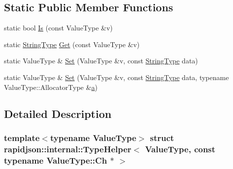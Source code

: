 \subsection*{Static Public Member Functions}
\begin{DoxyCompactItemize}
\item 
static bool \mbox{\hyperlink{structrapidjson_1_1internal_1_1_type_helper_3_01_value_type_00_01const_01typename_01_value_type_1_1_ch_01_5_01_4_abb87b939b67b66f0cd806513be7b2344}{Is}} (const Value\+Type \&v)
\item 
static \mbox{\hyperlink{structrapidjson_1_1internal_1_1_type_helper_3_01_value_type_00_01const_01typename_01_value_type_1_1_ch_01_5_01_4_a511422342701bd19c777d477275991e8}{String\+Type}} \mbox{\hyperlink{structrapidjson_1_1internal_1_1_type_helper_3_01_value_type_00_01const_01typename_01_value_type_1_1_ch_01_5_01_4_aa548b8d444b141ee138867898b4248d6}{Get}} (const Value\+Type \&v)
\item 
static Value\+Type \& \mbox{\hyperlink{structrapidjson_1_1internal_1_1_type_helper_3_01_value_type_00_01const_01typename_01_value_type_1_1_ch_01_5_01_4_a160c27c3120a9e6e4efcb8dd1134c020}{Set}} (Value\+Type \&v, const \mbox{\hyperlink{structrapidjson_1_1internal_1_1_type_helper_3_01_value_type_00_01const_01typename_01_value_type_1_1_ch_01_5_01_4_a511422342701bd19c777d477275991e8}{String\+Type}} data)
\item 
static Value\+Type \& \mbox{\hyperlink{structrapidjson_1_1internal_1_1_type_helper_3_01_value_type_00_01const_01typename_01_value_type_1_1_ch_01_5_01_4_a4e0291fb20d4dc5f5fde565a23b43298}{Set}} (Value\+Type \&v, const \mbox{\hyperlink{structrapidjson_1_1internal_1_1_type_helper_3_01_value_type_00_01const_01typename_01_value_type_1_1_ch_01_5_01_4_a511422342701bd19c777d477275991e8}{String\+Type}} data, typename Value\+Type\+::\+Allocator\+Type \&\mbox{\hyperlink{namespacerapidjson_a11fce64e721729aaf6be4a485c78f231}{a}})
\end{DoxyCompactItemize}


\subsection{Detailed Description}
\subsubsection*{template$<$typename Value\+Type$>$\newline
struct rapidjson\+::internal\+::\+Type\+Helper$<$ Value\+Type, const typename Value\+Type\+::\+Ch $\ast$ $>$}



